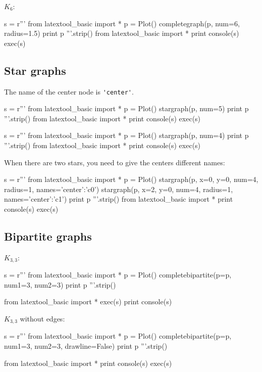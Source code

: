 $K_6$:
\begin{python}
s = r'''
from latextool_basic import *
p = Plot()
completegraph(p, num=6, radius=1.5)
print p
'''.strip()
from latextool_basic import *
print console(s)
exec(s)
\end{python}
  



\newpage
\subsection{Star graphs}

The name of the center node is \verb!'center'!.

\begin{python}
s = r'''
from latextool_basic import *
p = Plot()
stargraph(p, num=5)
print p
'''.strip()
from latextool_basic import *
print console(s)
exec(s)
\end{python}


\begin{python}
s = r'''
from latextool_basic import *
p = Plot()
stargraph(p, num=4)
print p
'''.strip()
from latextool_basic import *
print console(s)
exec(s)
\end{python}


When there are two stars, you need to give the centers different names:
\begin{python}
s = r'''
from latextool_basic import *
p = Plot()
stargraph(p, x=0, y=0, num=4, radius=1, names={'center':'c0'})
stargraph(p, x=2, y=0, num=4, radius=1, names={'center':'c1'})
print p
'''.strip()
from latextool_basic import *
print console(s)
exec(s)
\end{python}





\newpage
\subsection{Bipartite graphs}

$K_{3,3}$:
\begin{python}
s = r'''
from latextool_basic import *
p = Plot()
completebipartite(p=p, num1=3, num2=3)
print p
'''.strip()

from latextool_basic import *
exec(s)
print console(s)
\end{python}


$K_{3,3}$ without edges:
\begin{python}
s = r'''
from latextool_basic import *
p = Plot()
completebipartite(p=p, num1=3, num2=3, drawline=False)
print p
'''.strip()

from latextool_basic import *
print console(s)
exec(s)
\end{python}

